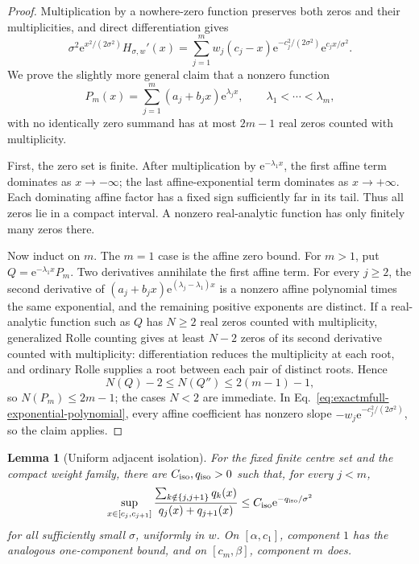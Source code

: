 \documentclass[aps,physrev,onecolumn,amsmath,amssymb,longbibliography]{revtex4-2}
\newcommand{\e}{\mathrm e}
\newtheorem{lemma}[theorem]{Lemma}
\begin{document}
\begin{proof}
Multiplication by a nowhere-zero function preserves both zeros and their
multiplicities, and direct differentiation gives
\begin{equation}
 \sigma^2\e^{x^2/(2\sigma^2)}H_{\sigma,w}'(x)
 =\sum_{j=1}^m w_j(c_j-x)
   \e^{-c_j^2/(2\sigma^2)}\e^{c_jx/\sigma^2}.
 \label{eq:exactmfull-exponential-polynomial}
\end{equation}
We prove the slightly more general claim that a nonzero function
\begin{equation}
 P_m(x)=\sum_{j=1}^m(a_j+b_jx)\e^{\lambda_jx},
 \qquad \lambda_1<\cdots<\lambda_m,
 \label{eq:exactmfull-general-exp-polynomial}
\end{equation}
with no identically zero summand has at most \(2m-1\) real zeros counted
with multiplicity.

First, the zero set is finite.  After multiplication by
\(\e^{-\lambda_1x}\), the first affine term dominates as \(x\to-\infty\);
the last affine-exponential term dominates as \(x\to+\infty\).  Each
dominating affine factor has a fixed sign sufficiently far in its tail.
Thus all zeros lie in a compact interval.  A nonzero real-analytic function
has only finitely many zeros there.

Now induct on \(m\).  The \(m=1\) case is the affine zero bound.  For
\(m>1\), put \(Q=\e^{-\lambda_1x}P_m\).  Two derivatives annihilate the first
affine term.  For every \(j\ge2\), the second derivative of
\((a_j+b_jx)\e^{(\lambda_j-\lambda_1)x}\) is a nonzero affine polynomial
times the same exponential, and the remaining positive exponents are
distinct.  If a real-analytic function such as \(Q\) has \(N\ge2\) real
zeros counted with
multiplicity, generalized Rolle counting gives at least \(N-2\) zeros of
its second derivative counted with multiplicity: differentiation reduces
the multiplicity at each root, and ordinary Rolle supplies a root between
each pair of distinct roots.  Hence
\begin{equation}
 N(Q)-2\le N(Q'')\le2(m-1)-1,
 \label{eq:exactmfull-rolle-count}
\end{equation}
so \(N(P_m)\le2m-1\); the cases \(N<2\) are immediate.  In
Eq.~\eqref{eq:exactmfull-exponential-polynomial}, every affine coefficient
has nonzero slope
\(-w_j\e^{-c_j^2/(2\sigma^2)}\), so the claim applies.
\end{proof}

\begin{lemma}[Uniform adjacent isolation]
\label{lem:exactmfull-adjacent-isolation}
For the fixed finite centre set and the compact weight family, there are
\(C_{\rm iso},q_{\rm iso}>0\) such that, for every \(j<m\),
\begin{equation}
 \sup_{x\in[c_j,c_{j+1}]}
 \frac{\sum_{k\notin\{j,j+1\}}q_k(x)}
      {q_j(x)+q_{j+1}(x)}
 \le C_{\rm iso}\e^{-q_{\rm iso}/\sigma^2}
 \label{eq:exactmfull-adjacent-isolation}
\end{equation}
for all sufficiently small \(\sigma\), uniformly in \(w\).  On
\([\alpha,c_1]\), component \(1\) has the analogous one-component bound, and
on \([c_m,\beta]\), component \(m\) does.
\end{lemma}
\end{document}
